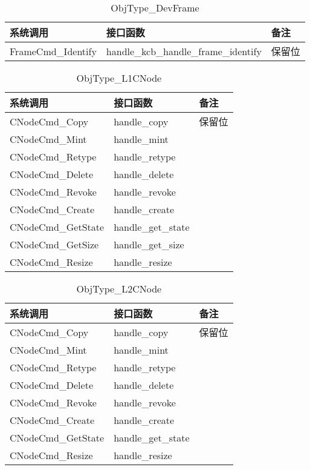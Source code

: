 \documentclass[a4paper, 12pt]{report}
\begin{document}
    \begin{table}[htbp]
        \centering
        \caption{ObjType\_DevFrame}
        \begin{tabular}{lll}
            \toprule
            系统调用 & 接口函数 & 备注 \\
            \midrule
            FrameCmd\_Identify & handle\_kcb\_handle\_frame\_identify & 保留位 \\
            \bottomrule
        \end{tabular}
    \end{table} 
    
    \begin{table}[htbp]
        \centering
        \caption{ObjType\_L1CNode}
        \begin{tabular}{lll}
            \toprule
            系统调用 & 接口函数 & 备注 \\
            \midrule
            CNodeCmd\_Copy & handle\_copy & 保留位 \\
            CNodeCmd\_Mint & handle\_mint & \\
            CNodeCmd\_Retype & handle\_retype & \\
            CNodeCmd\_Delete & handle\_delete & \\
            CNodeCmd\_Revoke & handle\_revoke & \\
            CNodeCmd\_Create & handle\_create & \\
            CNodeCmd\_GetState & handle\_get\_state & \\
            CNodeCmd\_GetSize & handle\_get\_size & \\
            CNodeCmd\_Resize & handle\_resize & \\
            \bottomrule
        \end{tabular}
    \end{table} 
    
    \begin{table}[htbp]
        \centering
        \caption{ObjType\_L2CNode}
        \begin{tabular}{lll}
            \toprule
            系统调用 & 接口函数 & 备注 \\
            \midrule
            CNodeCmd\_Copy & handle\_copy & 保留位 \\
            CNodeCmd\_Mint & handle\_mint & \\
            CNodeCmd\_Retype & handle\_retype & \\
            CNodeCmd\_Delete & handle\_delete & \\
            CNodeCmd\_Revoke & handle\_revoke & \\
            CNodeCmd\_Create & handle\_create & \\
            CNodeCmd\_GetState & handle\_get\_state & \\
            CNodeCmd\_Resize & handle\_resize & \\
            \bottomrule
        \end{tabular}
    \end{table}
    
\end{document}
